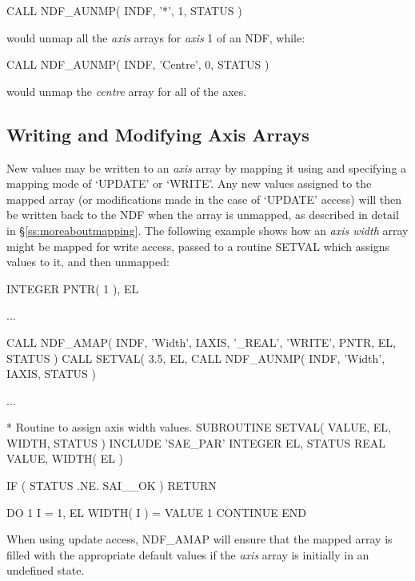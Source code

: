 \documentclass[twoside,11pt,nolof]{starlink}
\providecommand{\st}[1]{{\emph{#1}}}
\begin{document}
\small
\begin{terminalv}
      CALL NDF_AUNMP( INDF, '*', 1, STATUS )
\end{terminalv}
\normalsize

would unmap all the \st{axis\/} arrays for \st{axis\/} 1 of an NDF, while:

\small
\begin{terminalv}
      CALL NDF_AUNMP( INDF, 'Centre', 0, STATUS )
\end{terminalv}
\normalsize

would unmap the \st{centre\/} array for all of the axes.

\subsection{Writing and Modifying Axis Arrays}

New values may be written to an \st{axis\/} array by mapping it using
 and specifying a mapping mode of `UPDATE' or `WRITE'.
Any new values assigned to the mapped array (or modifications made in the
case of `UPDATE' access) will then be written back to the NDF when the array
is unmapped, as described in detail in \S\ref{ss:moreaboutmapping}.
The following example shows how an \st{axis width\/} array might be mapped
for write access, passed to a routine SETVAL which assigns values to it, and
then unmapped:

\small
\begin{terminalv}
      INTEGER PNTR( 1 ), EL

      ...

      CALL NDF_AMAP( INDF, 'Width', IAXIS, '_REAL', 'WRITE', PNTR, EL, STATUS )
      CALL SETVAL( 3.5, EL, %
      CALL NDF_AUNMP( INDF, 'Width', IAXIS, STATUS )

      ...

*  Routine to assign axis width values.
      SUBROUTINE SETVAL( VALUE, EL, WIDTH, STATUS )
      INCLUDE 'SAE_PAR'
      INTEGER EL, STATUS
      REAL VALUE, WIDTH( EL )

      IF ( STATUS .NE. SAI__OK ) RETURN

      DO 1 I = 1, EL
         WIDTH( I ) = VALUE
 1    CONTINUE
      END
\end{terminalv}
\normalsize

When using update access, NDF\_AMAP will ensure that the mapped array is
filled with the appropriate default values if the \st{axis\/} array is
initially in an undefined state.
\end{document}
